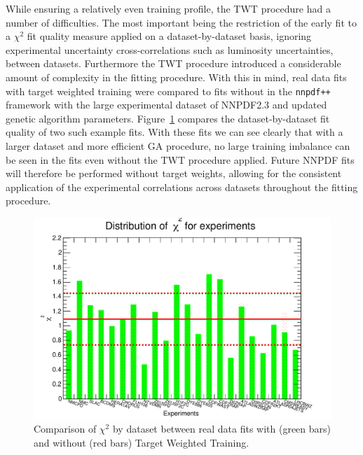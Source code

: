 While ensuring a relatively even training profile, the TWT procedure had a number of difficulties. The most important being the restriction of the early fit to a $\chi^2$ fit quality measure applied on a dataset-by-dataset basis, ignoring experimental uncertainty cross-correlations such as luminosity uncertainties, between datasets. Furthermore the TWT procedure introduced a considerable amount of complexity in the fitting procedure. With this in mind, real data fits with target weighted training were compared to fits without in the {\tt nnpdf++} framework with the large experimental dataset of NNPDF2.3 and updated genetic algorithm parameters. Figure~\ref{fig:twtvsnotwt} compares the dataset-by-dataset fit quality of two such example fits. With these fits we can see clearly that with a larger dataset and more efficient GA procedure, no large training imbalance can be seen in the fits even without the TWT procedure applied. Future NNPDF fits will therefore be performed without target weights, allowing for the consistent application of the experimental correlations across datasets throughout the fitting procedure.

\begin{figure}[!]
\centering
\includegraphics[width=1\textwidth]{7-PostLHC/figs/TWTvsnoTWT/chi2_histo.pdf}
\caption[Comparison of $\chi^2$ by dataset between real data fits with and without Target Weighted Training]{Comparison of $\chi^2$ by dataset between real data fits with (green bars) and without (red bars) Target Weighted Training.}
\label{fig:twtvsnotwt}
\end{figure}

